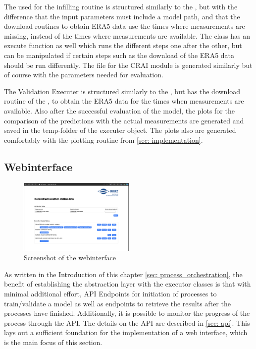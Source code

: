 The  used for the infilling routine is structured similarly to the , but with the difference that the input parameters must include a model path, and that the download routines to obtain ERA5 data use the times where measurements are missing, instead of the times where measurements are available.
The class has an execute function as well which runs the different steps one after the other, but can be manipulated if certain steps such as the download of the ERA5 data should be run differently.
The  file for the CRAI module is generated similarly but of course with the parameters needed for evaluation.

The Validation Executer is structured similarly to the , but has the download routine of the , to obtain the ERA5 data for the times when measurements are available.
Also after the successful evaluation of the model, the plots for the comparison of the predictions with the actual measurements are generated and saved in the temp-folder of the executer object.
The plots also are generated comfortably with the plotting routine from \autoref{sec: implementation}.

\subsection{Webinterface}

\begin{figure}
\centering
\includegraphics[width=0.5\textwidth]{resources/images/webinterface_screenshot.png}
\caption{Screenshot of the webinterface}
\label{fig: webinterface_screenshot}
\end{figure}

As written in the Introduction of this chapter \ref{sec: process_orchestration}, the benefit of establishing the abstraction layer with the executor classes is that with minimal additional effort, API Endpoints for initiation of processes to train/validate a model as well as endpoints to retrieve the results after the processes have finished.
Additionally, it is possible to monitor the progress of the process through the API.
The details on the API are described in \autoref{sec: api}.
This lays out a sufficient foundation for the implementation of a web interface, which is the main focus of this section.

